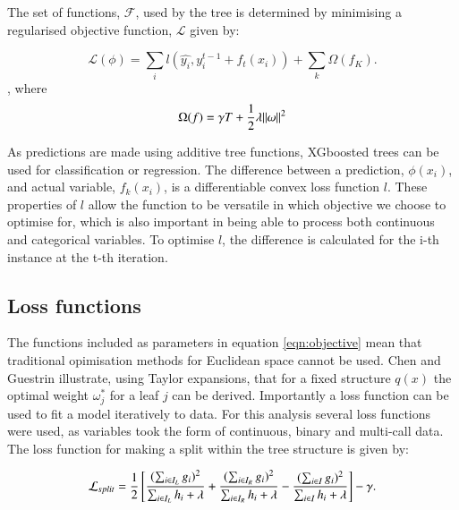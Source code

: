 \documentclass[review,12pt,authoryear]{elsarticle}
\begin{document}
\begin{linenumbers}
The set of functions, $\mathcal{F}$, used by the tree is determined by minimising a regularised objective function, $\mathcal{L}$ given by:

\begin{equation}\label{eqn:objective}
 \mathcal{L}(\phi)=\sum_i l(\hat{y_i}, y_i^{t-1} + f_t(x_i)) + \sum_k \Omega (f_K).
\end{equation}, where
\begin{equation}
  \Omega(f) = \gamma T + {{1}\over{2}}\lambda ||\omega||^2
\end{equation}

As predictions are made using additive tree functions, XGboosted trees can be used for classification or regression. The difference between a prediction, $\phi(x_i)$, and actual variable, $f_{k}(x_i)$, is a differentiable convex loss function $l$. These properties of $l$ allow the function to be versatile in which objective we choose to optimise for, which is also important in being able to process both continuous and categorical variables. To optimise $l$, the difference is calculated for the i-th instance at the t-th iteration.
\subsection{Loss functions}

The functions included as parameters in equation \ref{eqn:objective} mean that traditional opimisation methods for Euclidean space cannot be used. Chen and Guestrin \citep{chenXGBoostScalableTree2016} illustrate, using Taylor expansions, that for a fixed structure $q(x)$ the optimal weight $\omega^*_j$ for a leaf $j$ can be derived. Importantly a loss function can be used to fit a model iteratively to data. For this analysis several loss functions were used, as variables took the form of continuous, binary and multi-call data. The loss function for making a split within the tree structure is given by:

\begin{equation} \label{eqn:enumerate}
\mathcal{L}_{split} = {{1}\over{2}} \left[ 
 {{(\sum_{i\in I_L}g_i)^{2}}\over{\sum_{i\in I_L} h_i + \lambda}} +
 {{(\sum_{i\in I_R}g_i)^{2}}\over{\sum_{i\in I_R} h_i + \lambda}} -
 {{(\sum_{i\in I}{g_i})^{2}}\over{\sum_{i \in I} h_i + \lambda}} \right] - \gamma.
\end{equation}


\end{linenumbers}
\end{document}
